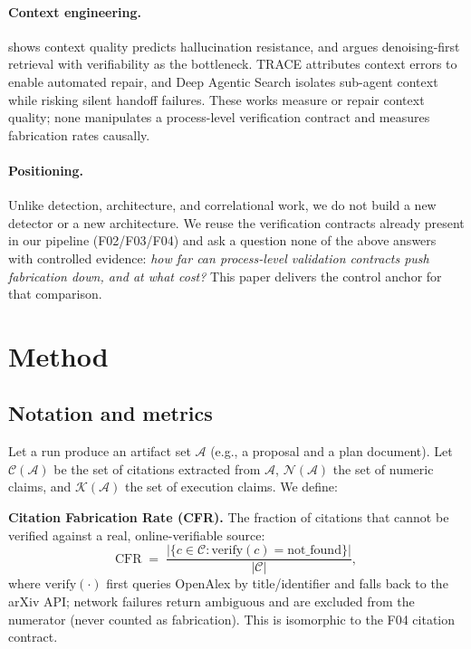 \documentclass[10pt,twocolumn]{article}
\begin{document}
\paragraph{Context engineering.}
\citet{bousetouane2026context} shows context quality predicts hallucination resistance, and \citet{dai2026llmorir} argues denoising-first retrieval with verifiability as the bottleneck. TRACE \citep{zhao2026trace} attributes context errors to enable automated repair, and Deep Agentic Search \citep{rafieioskooei2026deepagentic} isolates sub-agent context while risking silent handoff failures. These works measure or repair context quality; none manipulates a process-level verification contract and measures fabrication rates causally.

\paragraph{Positioning.}
Unlike detection, architecture, and correlational work, we do not build a new detector or a new architecture. We reuse the verification contracts already present in our pipeline (F02/F03/F04) and ask a question none of the above answers with controlled evidence: \emph{how far can process-level validation contracts push fabrication down, and at what cost?} This paper delivers the control anchor for that comparison.

\section{Method}
\label{sec:method}

\subsection{Notation and metrics}
Let a run produce an artifact set $\mathcal{A}$ (e.g., a proposal and a plan document). Let $\mathcal{C}(\mathcal{A})$ be the set of citations extracted from $\mathcal{A}$, $\mathcal{N}(\mathcal{A})$ the set of numeric claims, and $\mathcal{K}(\mathcal{A})$ the set of execution claims. We define:

\textbf{Citation Fabrication Rate (CFR).} The fraction of citations that cannot be verified against a real, online-verifiable source:
\begin{equation}
\mathrm{CFR} \;=\; \frac{|\{c \in \mathcal{C}: \mathrm{verify}(c) = \mathrm{not\_found}\}|}{|\mathcal{C}|},
\end{equation}
where $\mathrm{verify}(\cdot)$ first queries OpenAlex by title/identifier and falls back to the arXiv API; network failures return $\mathrm{ambiguous}$ and are excluded from the numerator (never counted as fabrication). This is isomorphic to the F04 citation contract.
\end{document}
